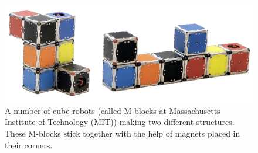 %
\begin{figure}[H]
	\centering
	\includegraphics[scale=0.3]{figures/m-blocks2}
	\caption{A number of cube robots (called M-blocks at Massachusetts Institute of Technology (MIT)) making two different structures. These M-blocks stick together with the help of magnets placed in their corners.\cite{LRosen}}
	\label{MBlocksExample}
\end{figure}
%
